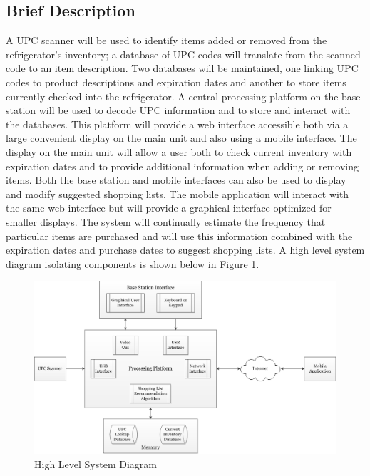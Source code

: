 \documentclass[11pt,letterpaper]{article}
\begin{document}
\subsection{Brief Description}
A UPC scanner will be used to identify items added or removed from the refrigerator's inventory; a database of UPC codes will translate from the scanned code to an item description. Two databases will be maintained, one linking UPC codes to product descriptions and expiration dates and another to store items currently checked into the refrigerator. A central processing platform on the base station will be used to decode UPC information and to store and interact with the databases. This platform will provide a web interface accessible both via a large convenient display on the main unit and also using a mobile interface. The display on the main unit will allow a user both to check current inventory with expiration dates and to provide additional information when adding or removing items. Both the base station and mobile interfaces can also be used to display and modify suggested shopping lists. The mobile application will interact with the same web interface but will provide a graphical interface optimized for smaller displays. The system will continually estimate the frequency that particular items are purchased and will use this information combined with the expiration dates and purchase dates to suggest shopping lists.
\newline \quad \newline
A high level system diagram isolating components is shown below in Figure \ref{fig:sysdiag}.
\begin{figure}[h!]
\begin{center}
\includegraphics[scale=0.5]{SmartFridgeTopLevel}
\end{center}
\caption{High Level System Diagram}
\label{fig:sysdiag}
\end{figure}
\pagebreak
\end{document}
